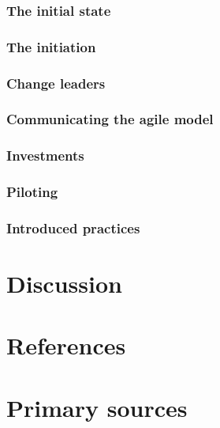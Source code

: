 \documentclass{article}
\begin{document}
\subsubsection{The initial state}

\subsubsection{The initiation}

\subsubsection{Change leaders}

\subsubsection{Communicating the agile model}

\subsubsection{Investments}

\subsubsection{Piloting}

\subsubsection{Introduced practices}



\section{Discussion}

\section{References}

\section{Primary sources}

\end{document}
